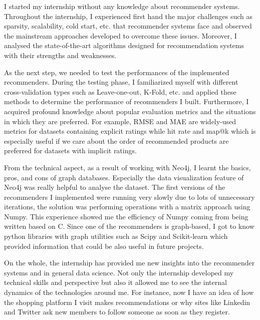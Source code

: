 I started my internship without any knowledge about recommender systems. Throughout the internship, I experienced first hand the major challenges such as sparsity, scalability, cold start, etc. that recommender systems face and observed the mainstream approaches developed to overcome these issues. Moreover, I analysed the state-of-the-art algorithms designed for recommendation systems with their strengths and weaknesses.

As the next step, we needed to test the performances of the implemented recommenders. During the testing phase, I familiarized myself with different cross-validation types such as Leave-one-out, K-Fold, etc. and applied these methods to determine the performance of recommenders I built. Furthermore, I acquired profound knowledge about popular evaluation metrics and the situations in which they are preferred. For example, RMSE and MAE are widely-used metrics for datasets containing explicit ratings while hit rate and map@k which is especially useful if we care about the order of recommended products are preferred for datasets with implicit ratings. 

From the technical aspect, as a result of working with Neo4j, I learnt the basics, pros, and cons of graph databases. Especially the data visualization feature of Neo4j was really helpful to analyse the dataset. The first versions of the recommenders I implemented were running very slowly due to lots of unnecessary iterations, the solution was performing operations with a matrix approach using Numpy. This experience showed me the efficiency of Numpy coming from being written based on C. Since one of the recommenders is graph-based, I got to know python libraries with graph utilities such as Scipy and Scikit-learn which provided information that could be also useful in future projects.

On the whole, the internship has provided me new insights into the recommender systems and in general data science. Not only the internship developed my technical skills and perspective but also it allowed me to see the internal dynamics of the technologies around me.  For instance, now I have an idea of how the shopping platform I visit makes recommendations or why sites like Linkedin and Twitter ask new members to follow someone as soon as they register. \\
